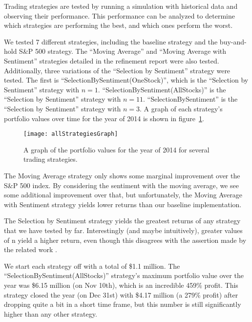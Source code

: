 Trading strategies are tested by running a simulation with historical data and observing their performance. This performance can be analyzed to determine which strategies are performing the best, and which ones perform the worst.

We tested 7 different strategies, including the baseline strategy and the buy-and-hold S\&P 500 strategy. The ``Moving Average'' and ``Moving Average with Sentiment'' strategies detailed in the refinement report were also tested. Additionally, three variations of the ``Selection by Sentiment'' strategy were tested. The first is ``SelectionBySentiment(OneStock)'', which is the ``Selection by Sentiment'' strategy with $n=1$. ``SelectionBySentiment(AllStocks)'' is the ``Selection by Sentiment'' strategy with $n=11$. ``SelectionBySentiment'' is the ``Selection by Sentiment'' strategy with $n=3$. A graph of each strategy's portfolio values over time for the year of 2014 is shown in figure~\ref{allStrategiesGraph}.

\begin{figure}[h]
  \label{allStrategiesGraph}
  \begin{center}
    \texttt{[image: allStrategiesGraph]}
  \end{center}
  \caption{A graph of the portfolio values for the year of 2014 for several trading strategies.}
\end{figure}

The Moving Average strategy only shows some marginal improvement over the S\&P 500 index. By considering the sentiment with the moving average, we see some additional improvement over that, but unfortunately, the Moving Average with Sentiment strategy yields lower returns than our baseline implementation.

The Selection by Sentiment strategy yields the greatest returns of any strategy that we have tested by far. Interestingly (and maybe intuitively), greater values of  n  yield a higher return, even though this disagrees with the assertion made by the related work \cite{tradingSentimentPaper}.

We start each strategy off with a total of \$1.1 million. The ``SelectionBySentiment(AllStocks)'' strategy’s maximum portfolio value over the year was \$6.15 million (on Nov 10th), which is an incredible 459\% profit. This strategy closed the year (on Dec 31st) with \$4.17 million (a 279\% profit) after dropping quite a bit in a short time frame, but this number is still significantly higher than any other strategy.

